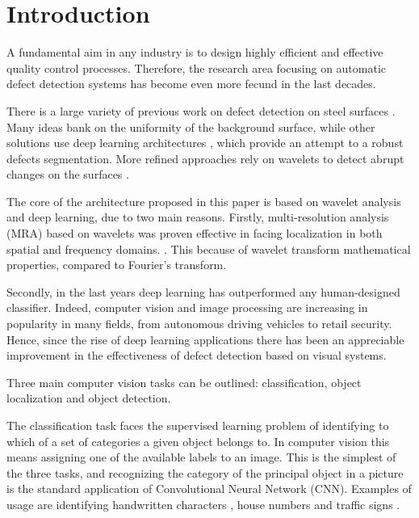 \section{Introduction}
    \par{
        A fundamental aim in any industry is to design highly efficient and effective quality control processes. Therefore, the research area focusing on automatic defect detection systems has become even more fecund in the last decades. 
    }
    \par{
        There is a large variety of previous work on defect detection on steel surfaces \cite{ieee:4777721, ieee:7030439, ieee:8623728, ieee:1334512, ieee:6738559}. Many ideas \cite{ieee:4777721, ieee:7030439, ieee:8623728} bank on the uniformity of the background surface, while other solutions use deep learning architectures \cite{ieee:1334512, ieee:6738559}, which provide an attempt to a robust defects segmentation. More refined approaches rely on wavelets to detect abrupt changes on the surfaces \cite{ieee:993164, ieee:6703333, ieee:7155940, sciencedirect:NGAN2011442}. 
    }
    \par{
        The core of the architecture proposed in this paper is based on wavelet analysis and deep learning, due to two main reasons. Firstly, multi-resolution analysis (MRA) based on wavelets was proven effective in facing localization in both spatial and frequency domains. \cite{Vetterli:1995:WSC:201007, Daubechies:1992:TLW:130655, intechopen:bernardini}. This because of wavelet transform mathematical properties, compared to Fourier's transform.
    }
    \par{
        Secondly, in the last years deep learning \cite{Goodfellow:2016:DL:3086952, Rojas:1996:NNS:235222} has outperformed any human-designed classifier. Indeed, computer vision and image processing are increasing in popularity in many fields, from autonomous driving vehicles to retail security. Hence, since the rise of deep learning applications \cite{researchgate:deeplearning} there has been an appreciable improvement in the effectiveness of defect detection based on visual systems.
    }
    \par{
        Three main computer vision tasks can be outlined: classification, object localization and object detection.
    }
    \par{
        The classification task faces the supervised learning problem of identifying to which of a set of categories a given object belongs to. In computer vision this means assigning one of the available labels to an image. This is the simplest of the three tasks, and recognizing the category of the principal object in a picture is the standard application of Convolutional Neural Network (CNN). Examples of usage are identifying handwritten characters \cite{nips:NIPS1989_293, ieee:6248110}, house numbers \cite{ieee:6460867} and traffic signs \cite{ieee:6248110}.

    }
